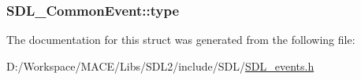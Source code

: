 \subsubsection[{\texorpdfstring{type}{type}}]{ S\+D\+L\+\_\+\+Common\+Event\+::type}\hypertarget{struct_s_d_l___common_event_a4ecd888325355321b42b2e2956f27453}{}\label{struct_s_d_l___common_event_a4ecd888325355321b42b2e2956f27453}


The documentation for this struct was generated from the following file\+:\begin{DoxyCompactItemize}
\item 
D\+:/\+Workspace/\+M\+A\+C\+E/\+Libs/\+S\+D\+L2/include/\+S\+D\+L/\hyperlink{_s_d_l__events_8h}{S\+D\+L\+\_\+events.\+h}\end{DoxyCompactItemize}
